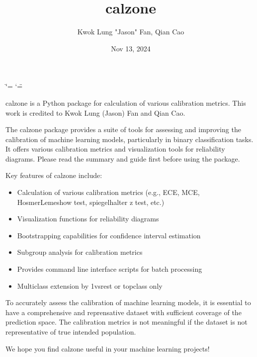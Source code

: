 \documentclass[letterpaper,10pt,english]{sphinxmanual}
\title{calzone}
\date{Nov 13, 2024}
\author{Kwok Lung "Jason" Fan, Qian Cao}
\begin{document}
\ifdefined\shorthandoff
  \ifnum\catcode`\=\string=\active\shorthandoff{=}\fi
  \ifnum\catcode`\"=\active{}\fi
\fi

\pagestyle{empty}
\sphinxmaketitle
\pagestyle{plain}
\sphinxtableofcontents
\pagestyle{normal}
\label{\detokenize{index::doc}}


\sphinxAtStartPar
calzone is a Python package for calculation of various calibration metrics. This work is credited to Kwok Lung (Jason) Fan and Qian Cao.

\sphinxAtStartPar
The calzone package provides a suite of tools for assessing and improving the calibration of machine learning models, particularly in binary classification tasks. It offers various calibration metrics and visualization tools for reliability diagrams.  Please read the summary and guide first  before using the package.

\sphinxAtStartPar
Key features of calzone include:
\begin{itemize}
\item {} 
\sphinxAtStartPar
Calculation of various calibration metrics (e.g., ECE, MCE, Hosmer\sphinxhyphen{}Lemeshow test, spiegelhalter z test, etc.)

\item {} 
\sphinxAtStartPar
Visualization functions for reliability diagrams

\item {} 
\sphinxAtStartPar
Bootstrapping capabilities for confidence interval estimation

\item {} 
\sphinxAtStartPar
Subgroup analysis for calibration metrics

\item {} 
\sphinxAtStartPar
Provides command line interface scripts for batch processing

\item {} 
\sphinxAtStartPar
Multi\sphinxhyphen{}class extension by 1\sphinxhyphen{}vs\sphinxhyphen{}rest or top\sphinxhyphen{}class only

\end{itemize}

\sphinxAtStartPar
To accurately assess the calibration of machine learning models, it is essential to have a comprehensive and reprensative dataset with sufficient coverage of the prediction space. The calibration metrics is not meaningful if the dataset is not representative of true intended population.

\sphinxAtStartPar
We hope you find calzone useful in your machine learning projects!
\end{document}
